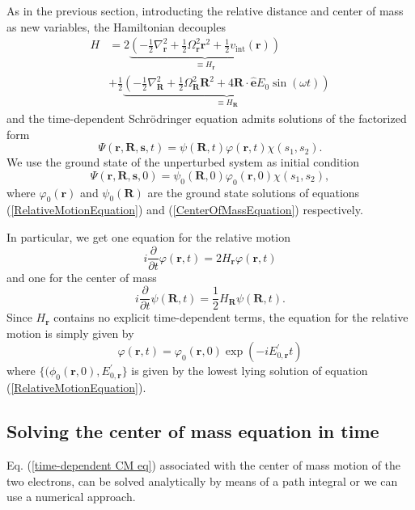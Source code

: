 \documentclass[aip,jcp,reprint,floatfix]{revtex4-1}
\begin{document}
\begin{appendices}
As in the previous section, introducting the relative distance and center of mass as new variables, the Hamiltonian decouples
\begin{align}
    H &= 2 \underbrace{\left( -\frac{1}{2} \nabla_\mathbf{r}^2 + \frac{1}{2} \Omega_\mathbf{r}^2 \mathbf{r}^2 + \frac{1}{2}v_{\text{int}}(\mathbf{r}) \right)}_{\equiv H_\mathbf{r}} \nonumber \\  &+ \frac{1}{2} \underbrace{\left( -\frac{1}{2}\nabla_\mathbf{R}^2 + \frac{1}{2}\Omega_\mathbf{R}^2 \mathbf{R}^2 + 4\mathbf{R} \cdot \hat{\mathbf{e}} E_0 \sin(\omega t) \right)}_{\equiv H_\mathbf{R}}
\end{align}
and the time-dependent Schrödringer equation admits solutions of the factorized form\cite{SCHWENGELBECK_1999}
\begin{equation}
    \Psi(\mathbf{r},\mathbf{R},\mathbf{s},t) = \psi(\mathbf{R},t) \varphi(\mathbf{r},t) \chi(s_1,s_2).
\end{equation}
We use the ground state of the unperturbed system as initial condition
\begin{equation}
    \Psi(\mathbf{r},\mathbf{R},\mathbf{s},0) = \psi_0(\mathbf{R},0) \varphi_0(\mathbf{r},0) \chi(s_1,s_2),
\end{equation}
where $\varphi_0(\mathbf{r})$ and $\psi_0(\mathbf{R})$ are the ground state solutions of equations (\ref{RelativeMotionEquation}) and (\ref{CenterOfMassEquation}) respectively.

In particular, we get one equation for the relative motion 
\begin{equation}
    i \frac{\partial}{\partial t} \varphi(\mathbf{r},t) = 2H_\mathbf{r} \varphi(\mathbf{r},t)
\end{equation}
and one for the center of mass
\begin{equation}
    i \frac{\partial}{\partial t} \psi(\mathbf{R},t) = \frac{1}{2}H_\mathbf{R} \psi(\mathbf{R},t) \label{time-dependent CM eq}.
\end{equation}
Since $H_\mathbf{r}$ contains no explicit time-dependent terms, the equation for the relative motion is simply given by 
\begin{equation}
    \varphi(\mathbf{r},t) = \varphi_0(\mathbf{r},0) \exp(-i E^\prime_{0,\mathbf{r}} t)
\end{equation}
where $\{(\phi_0(\mathbf{r},0),E^\prime_{0,\mathbf{r}}\}$ is given by the lowest lying solution of equation (\ref{RelativeMotionEquation}).

\subsection{Solving the center of mass equation in time}
Eq. (\ref{time-dependent CM eq}) associated with the center of mass motion of the two electrons, can be solved analytically by means of a path integral\cite{SCHWENGELBECK_1999} or we can use a numerical approach. 


\end{appendices}
\end{document}
